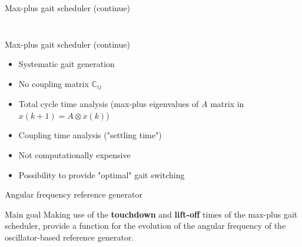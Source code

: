 \documentclass{beamer}
\begin{document}
\begin{frame}{Max-plus gait scheduler (continue)}
\begin{columns}
\begin{column}{0.55\textwidth}
\begin{table}[]
\centering
\label{my-label}
\end{table}
\end{column}
\end{columns}
\end{frame}

\begin{frame}{Max-plus gait scheduler (continue)}
\begin{itemize}
	\setlength\itemsep{2em}
	\item Systematic gait generation 
	\item No coupling matrix $\mathbb{C}_{ij}$
	\item Total cycle time analysis (max-plus eigenvalues of $A$ matrix in $x(k+1) = A\otimes x(k)$)
	\item Coupling time analysis ("settling time")
	\item Not computationally expensive
	\item Possibility to provide "optimal" gait switching
\end{itemize}	
\end{frame}

\begin{frame}{Angular frequency reference generator}
	\begin{block}{Main goal}
		\Large Making use of the \textbf{touchdown} and \textbf{lift-off} times of the max-plus gait scheduler, provide a function for the evolution of the angular frequency of the oscillator-based reference generator.
	\end{block}
\end{frame}
\end{document}
